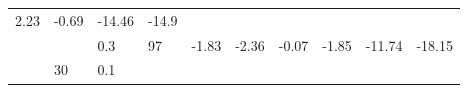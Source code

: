 \documentclass[12pt,oneside,a4paper]{reedthesis}
\begin{document}
\begin{longtable}[]{@{}llllllllll@{}}
\begin{minipage}[t]{0.07\columnwidth}
2.23\strut
\end{minipage} & \begin{minipage}[t]{0.07\columnwidth}\raggedright
-0.69\strut
\end{minipage} & \begin{minipage}[t]{0.09\columnwidth}\raggedright
-14.46\strut
\end{minipage} & \begin{minipage}[t]{0.09\columnwidth}\raggedright
-14.9\strut
\end{minipage}\tabularnewline
\begin{minipage}[t]{0.11\columnwidth}\raggedright
\strut
\end{minipage} & \begin{minipage}[t]{0.05\columnwidth}\raggedright
\strut
\end{minipage} & \begin{minipage}[t]{0.05\columnwidth}\raggedright
0.3\strut
\end{minipage} & \begin{minipage}[t]{0.05\columnwidth}\raggedright
97\strut
\end{minipage} & \begin{minipage}[t]{0.07\columnwidth}\raggedright
-1.83\strut
\end{minipage} & \begin{minipage}[t]{0.07\columnwidth}\raggedright
-2.36\strut
\end{minipage} & \begin{minipage}[t]{0.07\columnwidth}\raggedright
-0.07\strut
\end{minipage} & \begin{minipage}[t]{0.07\columnwidth}\raggedright
-1.85\strut
\end{minipage} & \begin{minipage}[t]{0.09\columnwidth}\raggedright
-11.74\strut
\end{minipage} & \begin{minipage}[t]{0.09\columnwidth}\raggedright
-18.15\strut
\end{minipage}\tabularnewline
\begin{minipage}[t]{0.11\columnwidth}\raggedright
\strut
\end{minipage} & \begin{minipage}[t]{0.05\columnwidth}\raggedright
30\strut
\end{minipage} & \begin{minipage}[t]{0.05\columnwidth}\raggedright
0.1\strut
\end{minipage} & \begin{minipage}[t]{0.05\columnwidth}\raggedright

\end{minipage}
\end{longtable}
\end{document}
